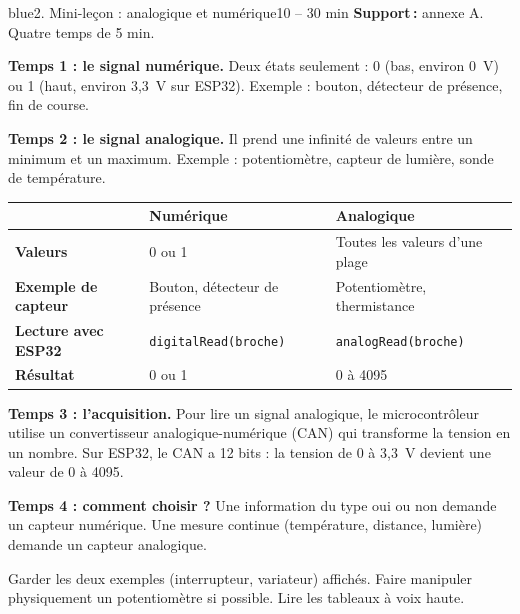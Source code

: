 \documentclass[11pt,a4paper]{article}
\begin{document}
\begin{etape}{blue}{2. Mini-leçon : analogique et numérique}{10 -- 30 min}
\textbf{Support\,:} annexe A. Quatre temps de 5 min.

\textbf{Temps 1 : le signal numérique.} Deux états seulement : 0 (bas, environ 0~V) ou 1 (haut, environ 3,3~V sur ESP32). Exemple : bouton, détecteur de présence, fin de course.

\textbf{Temps 2 : le signal analogique.} Il prend une infinité de valeurs entre un minimum et un maximum. Exemple : potentiomètre, capteur de lumière, sonde de température.

\begin{center}
\begin{tabularx}{\linewidth}{>{\bfseries}p{3.4cm}Y Y}
\toprule
 & Numérique & Analogique\\
\midrule
Valeurs & 0 ou 1 & Toutes les valeurs d'une plage\\
Exemple de capteur & Bouton, détecteur de présence & Potentiomètre, thermistance\\
Lecture avec ESP32 & \texttt{digitalRead(broche)} & \texttt{analogRead(broche)}\\
Résultat & 0 ou 1 & 0 à 4095\\
\bottomrule
\end{tabularx}
\end{center}

\textbf{Temps 3 : l'acquisition.} Pour lire un signal analogique, le microcontrôleur utilise un convertisseur analogique-numérique (CAN) qui transforme la tension en un nombre. Sur ESP32, le CAN a 12 bits : la tension de 0 à 3,3~V devient une valeur de 0 à 4095.

\begin{center}
\end{center}

\textbf{Temps 4 : comment choisir ?} Une information du type oui ou non demande un capteur numérique. Une mesure continue (température, distance, lumière) demande un capteur analogique.

\begin{astuce}
Garder les deux exemples (interrupteur, variateur) affichés. Faire manipuler physiquement un potentiomètre si possible. Lire les tableaux à voix haute.
\end{astuce}
\end{etape}
\end{document}
